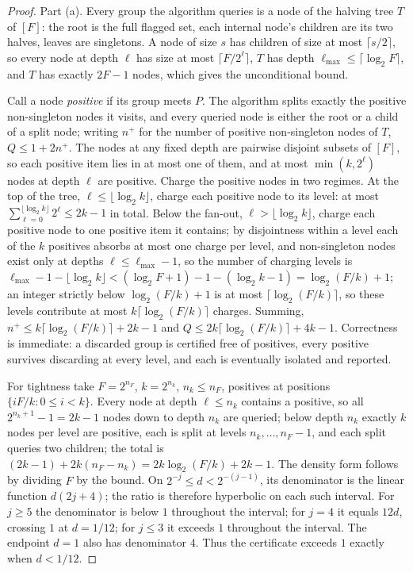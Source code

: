 \documentclass[11pt,a4paper]{article}
\theoremstyle{definition}
\theoremstyle{plain}
\begin{document}
\begin{proof}
\setlength{\parskip}{4pt plus 1pt}
Part (a). Every group the algorithm queries is a node of the halving tree $T$ of $[F]$: the
root is the full flagged set, each internal node's children are its two halves,
leaves are singletons. A node of size $s$ has children of size at most
$\lceil s/2\rceil$, so every node at depth $\ell$ has size at most
$\lceil F/2^\ell\rceil$, $T$ has depth $\ell_{\max}\le\lceil\log_2 F\rceil$, and $T$ has exactly
$2F-1$ nodes, which gives the unconditional bound.

Call a node \emph{positive} if its group meets $P$. The algorithm splits exactly
the positive non-singleton nodes it visits, and every queried node is either the
root or a child of a split node; writing $n^{+}$ for the number of positive
non-singleton nodes of $T$, $Q\le 1+2n^{+}$. The nodes at any fixed depth are
pairwise disjoint subsets of $[F]$, so each positive item lies in at most one of
them, and at most $\min(k,2^\ell)$ nodes at depth $\ell$ are positive. Charge the
positive nodes in two regimes. At the top of the tree, $\ell\le\lfloor\log_2 k\rfloor$,
charge each positive node to its level: at most
$\sum_{\ell=0}^{\lfloor\log_2 k\rfloor}2^\ell\le 2k-1$ in total. Below the fan-out,
$\ell>\lfloor\log_2 k\rfloor$, charge each positive node to one positive item it
contains; by disjointness within a level each of the $k$ positives absorbs at most
one charge per level, and non-singleton nodes exist only at depths $\ell\le \ell_{\max}-1$, so
the number of charging levels is
$\ell_{\max}-1-\lfloor\log_2 k\rfloor<(\log_2 F+1)-1-(\log_2 k-1)=\log_2(F/k)+1$; an integer
strictly below $\log_2(F/k)+1$ is at most $\lceil\log_2(F/k)\rceil$, so these
levels contribute at most $k\lceil\log_2(F/k)\rceil$ charges. Summing,
$n^{+}\le k\lceil\log_2(F/k)\rceil+2k-1$ and
$Q\le 2k\lceil\log_2(F/k)\rceil+4k-1$. Correctness is immediate: a discarded group
is certified free of positives, every positive survives discarding at every level,
and each is eventually isolated and reported.

For tightness take $F=2^{n_F}$, $k=2^{n_k}$, $n_k\le n_F$, positives at positions
$\{iF/k:0\le i<k\}$. Every node at depth $\ell\le n_k$ contains a positive, so all
$2^{n_k+1}-1=2k-1$ nodes down to depth $n_k$ are queried; below depth $n_k$ exactly $k$
nodes per level are positive, each is split at levels $n_k,\dots,n_F-1$, and each split
queries two children; the total is $(2k-1)+2k(n_F-n_k)=2k\log_2(F/k)+2k-1$. The
density form follows by dividing $F$ by the bound. On
$2^{-j}\le d<2^{-(j-1)}$, its denominator is the linear function
$d(2j+4)$; the ratio is therefore hyperbolic on each such interval.
For $j\ge5$ the denominator is below $1$ throughout the interval;
for $j=4$ it equals $12d$, crossing $1$ at $d=1/12$;
for $j\le3$ it exceeds $1$ throughout the interval. The endpoint $d=1$
also has denominator $4$. Thus the certificate exceeds $1$ exactly when
$d<1/12$.


\end{proof}
\end{document}
